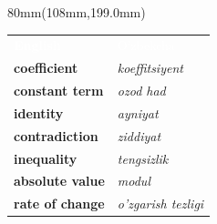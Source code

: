 \documentclass[a4paper]{article}
\begin{document}
\begin{textblock*}{80mm}(108mm,199.0mm)
{\fontsize{10.5}{12}\selectfont
\begin{tabular}{@{}>{\bfseries}p{37mm}p{36mm}@{}}
\cellcolor{accent}\textcolor{white}{\sffamily English} & \cellcolor{accent}\textcolor{white}{\sffamily O'zbekcha}\\
\rowcolor{badge!45} coefficient & {\itshape koeffitsiyent}\\
\rowcolor{white} constant term & {\itshape ozod had}\\
\rowcolor{badge!45} identity & {\itshape ayniyat}\\
\rowcolor{white} contradiction & {\itshape ziddiyat}\\
\rowcolor{badge!45} inequality & {\itshape tengsizlik}\\
\rowcolor{white} absolute value & {\itshape modul}\\
\rowcolor{badge!45} rate of change & {\itshape o'zgarish tezligi}\\
\end{tabular}}
\end{textblock*}
\end{document}
